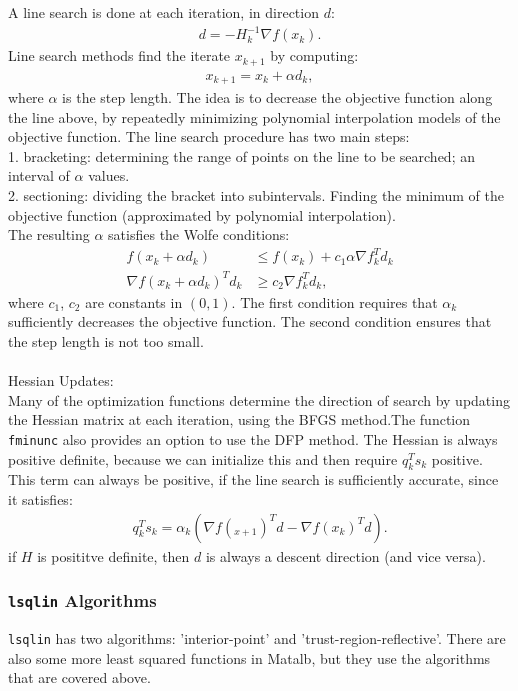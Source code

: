 \documentclass[11pt, a4paper]{article}
\theoremstyle{definition}
\begin{document}
A line search is done at each iteration, in direction $d$:
\begin{align*}
d= -H_k^{-1} \nabla f(x_k).
\end{align*}
Line search methods find the iterate $x_{k+1}$ by computing:
\begin{align*}
x_{k+1}=x_k + \alpha d_k,
\end{align*}
where $\alpha$ is the step length.
The idea is to decrease the objective function along the line above, by repeatedly minimizing polynomial interpolation models of the objective function. The line search procedure has two main steps:\\
1. bracketing: determining the range of points on the line to be searched; an interval of $\alpha$ values.\\
2. sectioning: dividing the bracket into subintervals. Finding the minimum of the objective function (approximated by polynomial interpolation).
\\
The resulting $\alpha$ satisfies the Wolfe conditions:
\begin{align*}
f(x_k + \alpha d_k) &\leq f(x_k) + c_1 \alpha \nabla f_k^T d_k\\
\nabla f(x_k + \alpha d_k)^T d_k &\geq c_2 \nabla f_k^T d_k,
\end{align*} 
where $c_1$, $c_2$ are constants in $(0,1)$.
The first condition requires that $\alpha_k$ sufficiently decreases the objective function. The second condition ensures that the step length is not too small.
\\
\\
Hessian Updates:\\
Many of the optimization functions determine the direction of search by updating the Hessian matrix at each iteration, using the BFGS method.The function \texttt{fminunc} also provides an option to use the DFP method.
The Hessian is always positive definite, because we can initialize this and then require $q_k^T s_k$ positive. 
This term can always be positive, if the line search is sufficiently accurate, since it satisfies:
\begin{align*}
q_k^T s_k= \alpha_k (\nabla f(_{x+1})^T d - \nabla f(x_k)^T d).
\end{align*} 
if $H$ is posititve definite, then $d$ is always a descent direction (and vice versa).


\subsubsection{\texttt{lsqlin} Algorithms}
\texttt{lsqlin} has two algorithms: 'interior-point' and 'trust-region-reflective'.
There are also some more least squared functions in Matalb, but they use the algorithms that are covered above.
\end{document}
